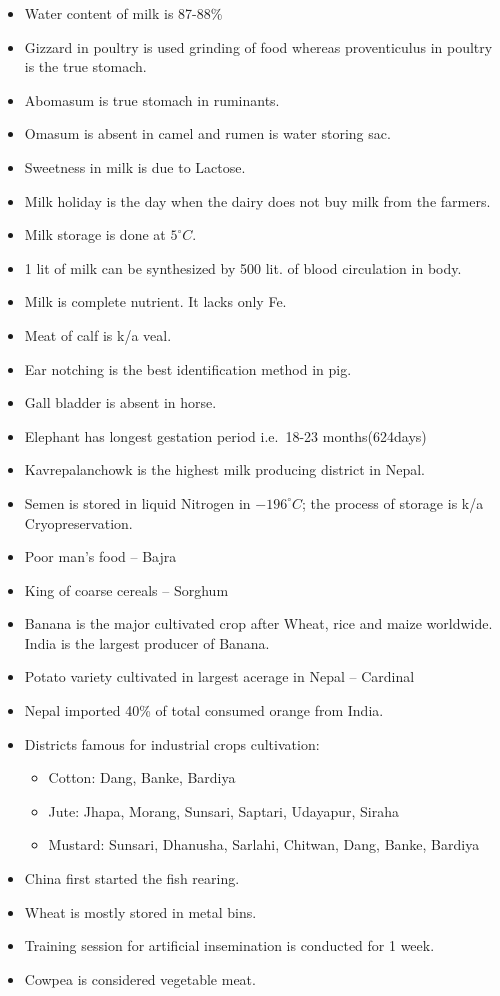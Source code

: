\documentclass[
  openany]{book}
\providecommand{\tightlist}{%
  \setlength{\itemsep}{0pt}\setlength{\parskip}{0pt}}
\begin{document}
\begin{itemize}
\item
  Water content of milk is 87-88\%
\item
  Gizzard in poultry is used grinding of food whereas proventiculus in poultry is the true stomach.
\item
  Abomasum is true stomach in ruminants.
\item
  Omasum is absent in camel and rumen is water storing sac.
\item
  Sweetness in milk is due to Lactose.
\item
  Milk holiday is the day when the dairy does not buy milk from the farmers.
\item
  Milk storage is done at \(5^\circ C\).
\item
  1 lit of milk can be synthesized by 500 lit. of blood circulation in body.
\item
  Milk is complete nutrient. It lacks only Fe.
\item
  Meat of calf is k/a veal.
\item
  Ear notching is the best identification method in pig.
\item
  Gall bladder is absent in horse.
\item
  Elephant has longest gestation period i.e.~18-23 months(624days)
\item
  Kavrepalanchowk is the highest milk producing district in Nepal.
\item
  Semen is stored in liquid Nitrogen in \(-196^\circ C\); the process of storage is k/a Cryopreservation.
\item
  Poor man's food -- Bajra
\item
  King of coarse cereals -- Sorghum
\item
  Banana is the major cultivated crop after Wheat, rice and maize worldwide. India is the largest producer of Banana.
\item
  Potato variety cultivated in largest acerage in Nepal -- Cardinal
\item
  Nepal imported 40\% of total consumed orange from India.
\item
  Districts famous for industrial crops cultivation:

  \begin{itemize}
  \tightlist
  \item
    Cotton: Dang, Banke, Bardiya
  \item
    Jute: Jhapa, Morang, Sunsari, Saptari, Udayapur, Siraha
  \item
    Mustard: Sunsari, Dhanusha, Sarlahi, Chitwan, Dang, Banke, Bardiya
  \end{itemize}
\item
  China first started the fish rearing.
\item
  Wheat is mostly stored in metal bins.
\item
  Training session for artificial insemination is conducted for 1 week.
\item
  Cowpea is considered vegetable meat.
\end{itemize}
\end{document}
